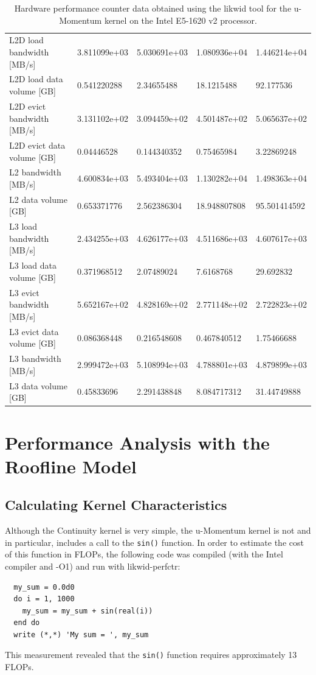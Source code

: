 \documentclass[12pt]{article}
\begin{document}
\begin{table}
\begin{tabular}{l|l|l|l|l}
\hline
L2D load bandwidth [MB/s]  &  3.811099e+03 &  5.030691e+03 & 1.080936e+04 & 1.446214e+04 \\
L2D load data volume [GB]  &   0.541220288 &   2.34655488  &  18.1215488  &   92.177536  \\
L2D evict bandwidth [MB/s] &  3.131102e+02 &  3.094459e+02 & 4.501487e+02 & 5.065637e+02 \\
L2D evict data volume [GB] &   0.04446528  &   0.144340352 &  0.75465984  &  3.22869248  \\
L2 bandwidth [MB/s]        &  4.600834e+03 &  5.493404e+03 & 1.130282e+04 & 1.498363e+04 \\
L2 data volume [GB]        &   0.653371776 &   2.562386304 & 18.948807808 & 95.501414592 \\
\hline
L3 load bandwidth [MB/s]  &  2.434255e+03 & 4.626177e+03 & 4.511686e+03 & 4.607617e+03 \\
L3 load data volume [GB]  &   0.371968512 &  2.07489024  &   7.6168768  &   29.692832  \\
L3 evict bandwidth [MB/s] &  5.652167e+02 & 4.828169e+02 & 2.771148e+02 & 2.722823e+02 \\
L3 evict data volume [GB] &   0.086368448 &  0.216548608 &  0.467840512 &  1.75466688  \\
L3 bandwidth [MB/s]       &  2.999472e+03 & 5.108994e+03 & 4.788801e+03 & 4.879899e+03 \\
L3 data volume [GB]       &   0.45833696  &  2.291438848 &  8.084717312 &  31.44749888 \\
\hline
\hline
\end{tabular}
\caption{Hardware performance counter data obtained using the likwid
  tool for the u-Momentum kernel on the Intel E5-1620 v2 processor.}
\label{TAB_hwpc_mom_u}
\end{table}

\section{Performance Analysis with the Roofline Model}

\subsection{Calculating Kernel Characteristics}

Although the Continuity kernel is very simple, the u-Momentum kernel
is not and in particular, includes a call to the {\tt sin()} function.
In order to estimate the cost of this function in FLOPs, the following
code was compiled (with the Intel compiler and -O1) and run with
likwid-perfctr:
\begin{verbatim}
  my_sum = 0.0d0
  do i = 1, 1000
    my_sum = my_sum + sin(real(i))
  end do
  write (*,*) 'My sum = ', my_sum
\end{verbatim}
This measurement revealed that the {\tt sin()} function requires
approximately 13 FLOPs.
\end{document}
